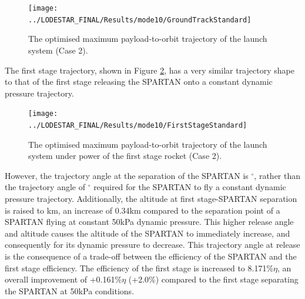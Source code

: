 \begin{figure}[ht!]
	
	
	
	\centering
	\texttt{[image: ../LODESTAR\_FINAL/Results/mode10/GroundTrackStandard]}
	\caption{The optimised maximum payload-to-orbit trajectory of the launch system (Case 2).}
	\label{fig:GroundTrackStandardNoReturn}
\end{figure}


The first stage trajectory, shown in Figure \ref{fig:FirstStageStandardNoReturn}, has a very similar trajectory shape to that of the first stage releasing the SPARTAN onto a constant dynamic pressure trajectory.
\begin{figure}[ht!]
	\centering
	\texttt{[image: ../LODESTAR\_FINAL/Results/mode10/FirstStageStandard]}
	\caption{The optimised maximum payload-to-orbit trajectory of the launch system under power of the first stage rocket (Case 2).}
	\label{fig:FirstStageStandardNoReturn}
\end{figure}
 However, the trajectory angle at the separation of the SPARTAN is \secondthirdSeparationgammaqStandardNoReturn$^\circ$, rather than the trajectory angle of \secondthirdSeparationgammaConstq$^\circ$ required for the SPARTAN to fly a constant dynamic pressure trajectory. Additionally, the altitude at first stage-SPARTAN separation is raised to \firstsecondSeparationAltStandardNoReturn km, an increase of 0.34km compared to the separation point of a SPARTAN flying at constant 50kPa dynamic pressure. This higher release angle and altitude causes the altitude of the SPARTAN to immediately increase, and consequently for its dynamic pressure to decrease. This trajectory angle at release is the consequence of a trade-off between the efficiency of the SPARTAN and the first stage efficiency. The efficiency of the first stage is increased to 8.171\%$\eta$, an overall improvement of +0.161\%$\eta$ (+2.0\%) compared to the first stage separating the SPARTAN at 50kPa conditions. 
 
